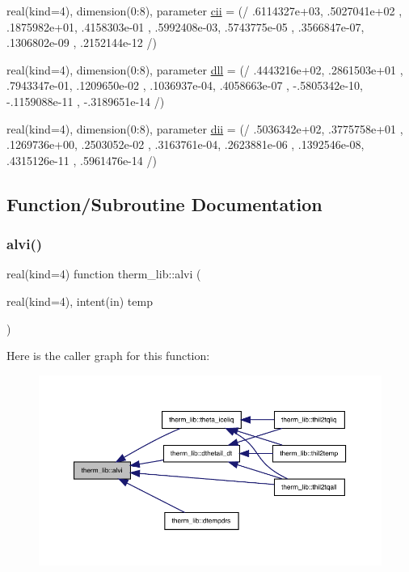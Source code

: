 \begin{DoxyCompactItemize}
\item 
real(kind=4), dimension(0\+:8), parameter \hyperlink{namespacetherm__lib_a80e96618552a9428c5819e0f9fcbc242}{cii} = (/ .\+6114327e+03, .\+5027041e+02 , .\+1875982e+01, .\+4158303e-\/01 , .\+5992408e-\/03, .\+5743775e-\/05 , .\+3566847e-\/07, .\+1306802e-\/09 , .\+2152144e-\/12 /)
\item 
real(kind=4), dimension(0\+:8), parameter \hyperlink{namespacetherm__lib_acfbfc8c511318be0ac3c435bec00f876}{dll} = (/ .\+4443216e+02, .\+2861503e+01 , .\+7943347e-\/01, .\+1209650e-\/02 , .\+1036937e-\/04, .\+4058663e-\/07 , -\/.\+5805342e-\/10, -\/.\+1159088e-\/11 , -\/.\+3189651e-\/14 /)
\item 
real(kind=4), dimension(0\+:8), parameter \hyperlink{namespacetherm__lib_ac6f7b02070a3ef627b731ecd1b7afb1a}{dii} = (/ .\+5036342e+02, .\+3775758e+01 , .\+1269736e+00, .\+2503052e-\/02 , .\+3163761e-\/04, .\+2623881e-\/06 , .\+1392546e-\/08, .\+4315126e-\/11 , .\+5961476e-\/14 /)
\end{DoxyCompactItemize}


\subsection{Function/\+Subroutine Documentation}
\mbox{\label{namespacetherm__lib_a4fbc9bf6cc7bc66ef4c68393149d7288}} 
\subsubsection{\texorpdfstring{alvi()}{alvi()}}
{\footnotesize\ttfamily real(kind=4) function therm\+\_\+lib\+::alvi (\begin{DoxyParamCaption}\item[{real(kind=4), intent(in)}]{temp }\end{DoxyParamCaption})}

Here is the caller graph for this function\+:
\nopagebreak
\begin{figure}[H]
\begin{center}
\leavevmode
\includegraphics[width=350pt]{namespacetherm__lib_a4fbc9bf6cc7bc66ef4c68393149d7288_icgraph}
\end{center}
\end{figure}
\mbox{\label{namespacetherm__lib_a543f4c6ab155d99ad9a5002a8143a654}} 
